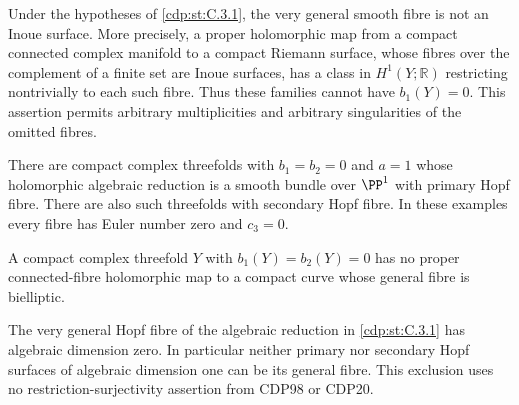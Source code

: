 \begin{proposition}\hypertarget{tag-01F7}{}\label{cdp:st:C.3.12}



Under the hypotheses of \ref{cdp:st:C.3.1}, the very general smooth fibre is
not an Inoue surface. More precisely, a proper holomorphic map from
a compact connected complex manifold to a compact Riemann surface,
whose fibres over the complement of a finite set are Inoue surfaces,
has a class in $H^1(Y;\mathbb R)$ restricting nontrivially to each
such fibre. Thus these families cannot have $b_1(Y)=0$.
This assertion permits arbitrary multiplicities and arbitrary
singularities of the omitted fibres.
\end{proposition}

\begin{proposition}\hypertarget{tag-01FC}{}\label{cdp:st:C.3.6}



There are compact complex threefolds with $b_1=b_2=0$ and $a=1$
whose holomorphic algebraic reduction is a smooth bundle over
$\PP^1$ with primary Hopf fibre. There are also such threefolds
with secondary Hopf fibre. In these examples every fibre has Euler
number zero and $c_3=0$.
\end{proposition}

\begin{proposition}\hypertarget{tag-01FD}{}\label{cdp:st:C.3.7}



A compact complex threefold $Y$ with $b_1(Y)=b_2(Y)=0$ has no
proper connected-fibre holomorphic map to a compact curve whose
general fibre is bielliptic.
\end{proposition}

\begin{proposition}\hypertarget{tag-01FE}{}\label{cdp:st:C.3.8}



The very general Hopf fibre of the algebraic reduction in \ref{cdp:st:C.3.1}
has algebraic dimension zero. In particular neither primary nor
secondary Hopf surfaces of algebraic dimension one can be its
general fibre. This exclusion uses no restriction-surjectivity
assertion from CDP98 or CDP20.
\end{proposition}

